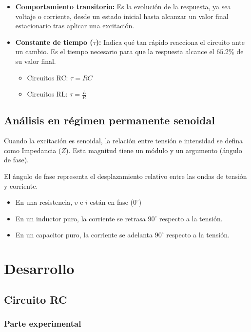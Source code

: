 \documentclass[letter,11pt]{article}
\begin{document}
		\begin{itemize}
			\item \textbf{Comportamiento transitorio:} Es la evolución de la respuesta, ya sea voltaje o corriente, desde un estado inicial hasta alcanzar un valor final estacionario tras aplicar una excitación.
			\item \textbf{Constante de tiempo ($\tau$):} Indica qué tan rápido reacciona el circuito ante un cambio. 
			Es el tiempo necesario para que la respuesta alcance el $65.2\%$ de su valor final.
			
			\begin{itemize}
				\item Circuitos RC: $\tau = RC$
				\item Circuitos RL: $\tau = \frac{L}{R}$
			\end{itemize}
			
		\end{itemize}
	
	\subsection{Análisis en régimen permanente senoidal}
	
		Cuando la excitación es senoidal, la relación entre tensión e intensidad se defina como Impedancia ($Z$).
		Esta magnitud tiene un módulo y un argumento (ángulo de fase).
		
		El ángulo de fase representa el desplazamiento relativo entre las ondas de tensión y corriente.
		
		\begin{itemize}
			\item En una resistencia, $v$ e $i$ están en fase ($0^\circ$)
			\item En un inductor puro, la corriente se retrasa $90^\circ$ respecto a la tensión.
			\item En un capacitor puro, la corriente se adelanta $90^\circ$ respecto a la tensión.
		\end{itemize}
	
\section{Desarrollo}
	
	\subsection{Circuito RC}
	
		\subsubsection{Parte experimental}
		
\end{document}

